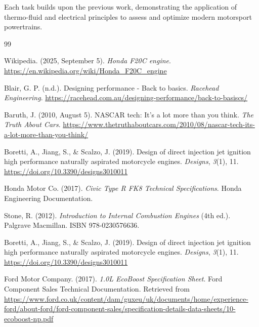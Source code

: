 \documentclass[12pt,a4paper]{report}
\newcounter{task}
\begin{document}
Each task builds upon the previous work, demonstrating the application of thermo-fluid and electrical principles to assess and optimize modern motorsport powertrains.

\newpage










\begin{thebibliography}{99}

Wikipedia. (2025, September 5). \textit{Honda F20C engine}. \url{https://en.wikipedia.org/wiki/Honda_F20C_engine}

Blair, G. P. (n.d.). Designing performance - Back to basics. \textit{Racehead Engineering}. 
\url{https://racehead.com.au/designing-performance/back-to-basiscs/}

Baruth, J. (2010, August 5). NASCAR tech: It's a lot more than you think. \textit{The Truth About Cars}. \url{https://www.thetruthaboutcars.com/2010/08/nascar-tech-its-a-lot-more-than-you-think/}

Boretti, A., Jiang, S., \& Scalzo, J. (2019). Design of direct injection jet ignition high performance naturally aspirated motorcycle engines. \textit{Designs}, \textit{3}(1), 11. \url{https://doi.org/10.3390/designs3010011}

Honda Motor Co. (2017). \textit{Civic Type R FK8 Technical Specifications}. Honda Engineering Documentation.

Stone, R. (2012). \textit{Introduction to Internal Combustion Engines} (4th ed.). Palgrave Macmillan. ISBN 978-0230576636.

Boretti, A., Jiang, S., \& Scalzo, J. (2019). Design of direct injection jet ignition high performance naturally aspirated motorcycle engines. \textit{Designs}, \textit{3}(1), 11. \url{https://doi.org/10.3390/designs3010011}

Ford Motor Company. (2017). \textit{1.0L EcoBoost Specification Sheet}. Ford Component Sales Technical Documentation. Retrieved from \url{https://www.ford.co.uk/content/dam/guxeu/uk/documents/home/experience-ford/about-ford/ford-component-sales/specification-details-data-sheets/10-ecoboost-np.pdf}


\end{thebibliography}
\end{document}
